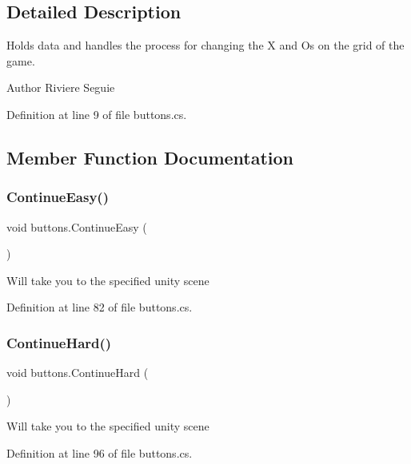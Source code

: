 \subsection{Detailed Description}
Holds data and handles the process for changing the X and Os on the grid of the game. \begin{DoxyAuthor}{Author}
Riviere Seguie 
\end{DoxyAuthor}


Definition at line 9 of file buttons.\+cs.



\subsection{Member Function Documentation}
\mbox{\label{classbuttons_a5240065cedeabf4dc24e9295bbcb3805}} 
\subsubsection{\texorpdfstring{ContinueEasy()}{ContinueEasy()}}
{\footnotesize\ttfamily void buttons.\+Continue\+Easy (\begin{DoxyParamCaption}{ }\end{DoxyParamCaption})}

Will take you to the specified unity scene 

Definition at line 82 of file buttons.\+cs.

\mbox{\label{classbuttons_a954a018dd64cf62fc51aaf7eec5f284c}} 
\subsubsection{\texorpdfstring{ContinueHard()}{ContinueHard()}}
{\footnotesize\ttfamily void buttons.\+Continue\+Hard (\begin{DoxyParamCaption}{ }\end{DoxyParamCaption})}

Will take you to the specified unity scene 

Definition at line 96 of file buttons.\+cs.

\mbox{\label{classbuttons_ad0267c77caf56c63e3dbea543113c349}} 
